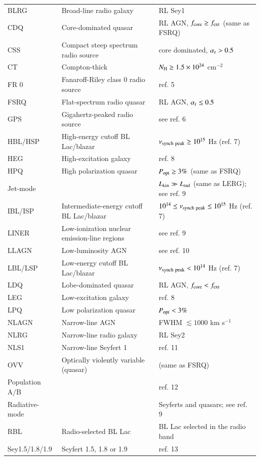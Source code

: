 \begin{tiny}
\begin{table}
\begin{center}
\begin{tabular}{lll}
BLRG &Broad-line radio galaxy & RL Sey1 \\
CDQ & Core-dominated quasar & RL AGN, $f_{\rm core} \ge f_{\rm ext}$ (same as FSRQ)\\
CSS &Compact steep spectrum radio source & core dominated, $\alpha_{\rm r} > 0.5$ \\
CT & Compton-thick & $N_{\rm H} \ge 1.5 \times 10^{24}$ cm$^{-2}$  \\
FR 0 &Fanaroff-Riley class 0 radio source & ref. 5 \\
FSRQ &Flat-spectrum radio quasar & RL AGN, $\alpha_{\rm r} \le 0.5$  \\
GPS &Gigahertz-peaked radio source & see ref. 6\\
HBL/HSP & High-energy cutoff BL Lac/blazar &  $\nu_{\rm synch~peak} \ge 10^{15}$ Hz 
(ref. 7)\\
HEG &High-excitation galaxy & ref. 8\\
HPQ & High polarization quasar & $P_{\rm opt} \ge 3 \%$ (same as FSRQ)\\
Jet-mode & & $L_{\rm kin} \gg L_{\rm rad}$ (same as LERG); see ref. 9\\
IBL/ISP & Intermediate-energy cutoff BL Lac/blazar & $10^{14} \le \nu_{\rm synch~peak} \le 10^{15}$ Hz 
(ref. 7)\\
LINER & Low-ionization nuclear emission-line regions &  see ref. 9\\
LLAGN & Low-luminosity AGN & see ref. 10\\
LBL/LSP & Low-energy cutoff BL Lac/blazar & $\nu_{\rm synch~peak} < 10^{14}$ Hz 
(ref. 7)\\
LDQ & Lobe-dominated quasar & RL AGN, $f_{\rm core} < f_{\rm ext}$\\
LEG &Low-excitation galaxy & ref. 8\\
LPQ & Low polarization quasar & $P_{\rm opt} < 3 \%$ \\
NLAGN &Narrow-line AGN & FWHM $\lesssim 1000$ km s$^{-1}$   \\
NLRG &Narrow-line radio galaxy & RL Sey2 \\
NLS1 & Narrow-line Seyfert 1 & ref. 11 \\
OVV &Optically violently variable (quasar) & (same as FSRQ)\\
Population A/B & & ref. 12\\
Radiative-mode & & Seyferts and quasars; see ref. 9\\
RBL & Radio-selected BL Lac & BL Lac selected in the radio band \\
Sey1.5/1.8/1.9 & Seyfert 1.5, 1.8 or 1.9 & ref. 13 \\

\end{tabular}
\end{center}
\end{table}
\end{tiny}
